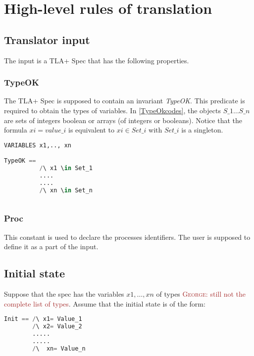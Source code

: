 \documentclass{article}
\theoremstyle{plain}
\numberwithin{equation}{section}
\newcommand{\george}[1]{\textcolor{brown}{\textsc{George: } {\sf #1}}}
\begin{document}
\section{High-level rules of translation }
  




\subsection{Translator input}
The input is a TLA+ Spec that has the following properties. 



\subsubsection{TypeOK} \label{TypeOK} The TLA+ Spec is supposed to contain an invariant \emph{TypeOK}.  This predicate is required to obtain the types of variables. In \eqref{TypeOkcodes}, the objects $S\_1 \dots S\_n$ are sets of integers boolean or arrays (of integers or booleans). Notice that the formula $xi=value\_i$ is equivalent to $xi \in Set\_i$ with $Set\_i$ is a singleton. 


\begin{lstlisting}[language=Python,caption={The explicit form of the predicate \emph{TypeOK}.}, label={TypeOkcodes}] 
VARIABLES x1,.., xn

TypeOK == 
          /\ x1 \in Set_1
          ....
          ....
          /\ xn \in Set_n
 
\end{lstlisting}

\subsubsection{Proc}\label{Proc} This constant is used to declare the processes identifiers. The user is supposed to define it as a part of the input. 


\subsection{Initial state} 
Suppose that the spec has the variables $x1, \dots, xn$ of types \george{still not the complete list of types}.  
Assume that the initial state is of the form: 

\begin{lstlisting}[language=Python]
Init == /\ x1= Value_1  
        /\ x2= Value_2  
        .....
        .....
        /\  xn= Value_n   
\end{lstlisting}
\end{document}
